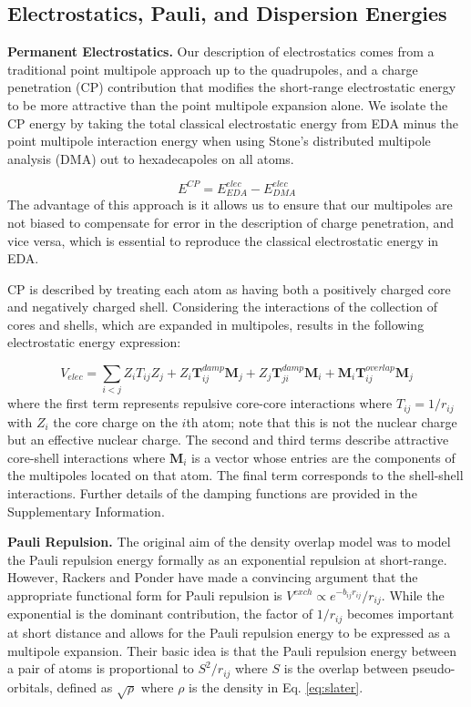\documentclass[journal=jctcce,manuscript=article]{achemso}
\begin{document}
\subsection*{Electrostatics, Pauli, and Dispersion Energies}
\textbf{Permanent Electrostatics.} Our description of electrostatics comes from a traditional point multipole approach up to the quadrupoles, and a charge penetration (CP) contribution that modifies the short-range electrostatic energy to be more attractive than the
point multipole expansion alone. We isolate the CP energy by taking the total classical electrostatic energy from EDA minus the point multipole interaction energy
when using Stone's distributed multipole analysis (DMA)\cite{stone1981distributed,stone1985distributeda}
out to hexadecapoles on all atoms.

\begin{equation}
  E^{CP}=E^{elec}_{EDA}-E^{elec}_{DMA}
  \label{eq:cp}
\end{equation}
The advantage of this approach is it allows us to ensure that our multipoles are not biased to compensate for error in the description of charge penetration, and vice versa, which is essential to reproduce the classical electrostatic energy in EDA.

CP is described by treating each atom as having both a positively charged core and negatively charged shell. Considering the interactions of the collection of cores and shells, which are expanded in multipoles,
results in the following electrostatic energy expression:

\begin{equation}
  V_{elec}=\sum_{i<j}Z_iT_{ij}Z_j+Z_i\bm{T}_{ij}^{damp}\bm{M}_j+Z_j\bm{T}_{ji}^{damp}\bm{M}_i+\bm{M}_i\bm{T}_{ij}^{overlap}\bm{M}_j
  \label{eq:elec}
\end{equation}
where the first term represents repulsive core-core interactions where $T_{ij}=1/r_{ij}$
with $Z_i$ the core charge on the $i$th atom; note that this is not the nuclear charge but an effective
nuclear charge. The second and third terms describe attractive core-shell interactions where $\bm{M}_i$ is
a vector whose entries are the components of the multipoles located on that atom. The final term corresponds to the shell-shell interactions. Further details of the damping functions are provided in the Supplementary Information. 


\textbf{Pauli Repulsion.} The original aim of the density overlap model was to model the
Pauli repulsion energy formally as an exponential
repulsion at short-range.\cite{wallqvist1989new,wheatley1990overlap,gordon1996approximate} However, Rackers and Ponder have made a convincing argument that the appropriate
functional form for Pauli repulsion is 
$V^{exch}\propto e^{-b_{ij}r_{ij}}/r_{ij}$.\cite{rackers2019classical,rackers2021polarizable}
While the exponential is the dominant contribution, the factor of $1/r_{ij}$
becomes important at short distance and allows for the Pauli repulsion energy
to be expressed as a multipole expansion. Their basic idea is that the Pauli repulsion energy
between a pair of atoms is proportional to $S^2/r_{ij}$ where $S$ is the overlap between pseudo-orbitals, defined as $\sqrt{\rho}$ where $\rho$ is the density in Eq. \ref{eq:slater}.
\end{document}
